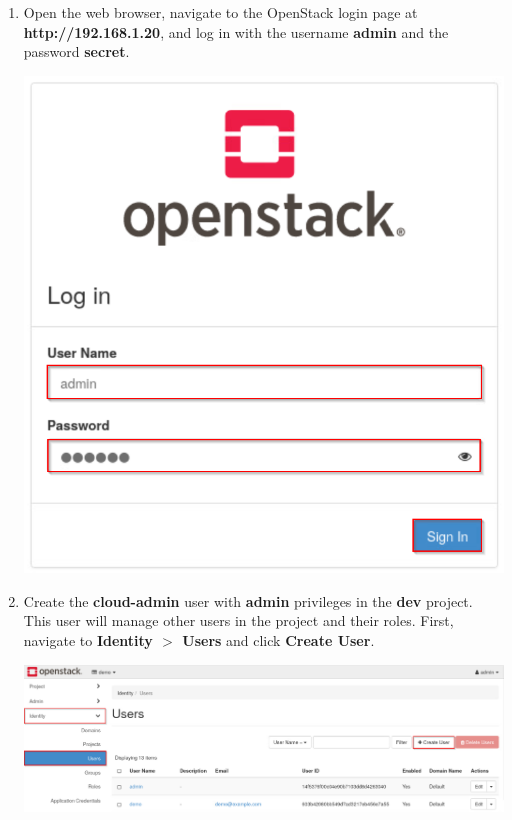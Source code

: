\documentclass[letterpaper, 12pt]{article}
\begin{document}
\begin{enumerate}
    \item Open the web browser, navigate to the OpenStack login page at \textbf{http://192.168.1.20}, and log in with the username \textbf{admin} and the password \textbf{secret}.

    \begin{center}
        \includegraphics[scale=0.5]{images/part3/step1.png}
    \end{center}

    \item Create the \textbf{cloud-admin} user with \textbf{admin} privileges in the \textbf{dev} project.
    This user will manage other users in the project and their roles.
    First, navigate to \textbf{Identity $>$ Users} and click \textbf{Create User}.

    \begin{center}
        \includegraphics[width=\linewidth]{images/part3/step2.png}
    \end{center}


\end{enumerate}
\end{document}
